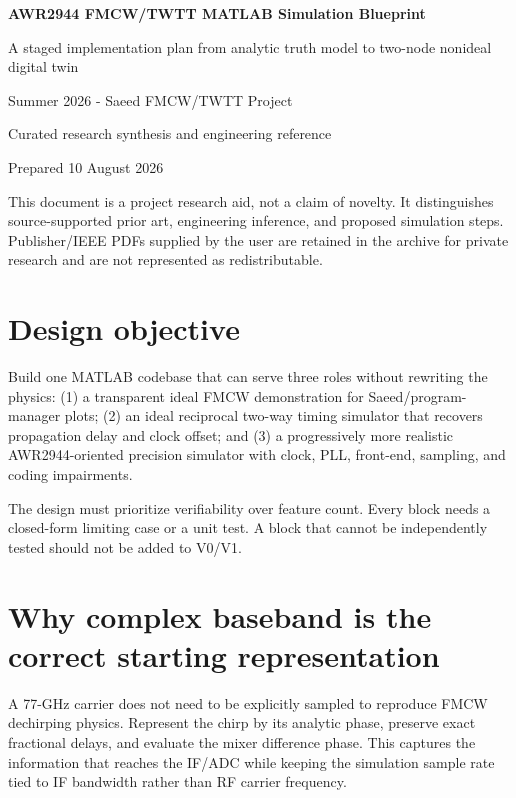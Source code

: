 \documentclass[11pt]{article}
\begin{document}
\begin{titlepage}
\centering
\vspace*{1.2in}
{\Huge\bfseries\color{navy} AWR2944 FMCW/TWTT MATLAB Simulation Blueprint\par}
\vspace{0.3in}
{\Large A staged implementation plan from analytic truth model to two-node nonideal digital twin\par}
\vspace{0.6in}
{\large Summer 2026 - Saeed FMCW/TWTT Project\par}
\vfill
{\large Curated research synthesis and engineering reference\par}
{\large Prepared 10 August 2026\par}
\vspace{0.4in}
\begin{minipage}{0.82\textwidth}
\small
This document is a project research aid, not a claim of novelty. It distinguishes source-supported prior art, engineering inference, and proposed simulation steps. Publisher/IEEE PDFs supplied by the user are retained in the archive for private research and are not represented as redistributable.
\end{minipage}
\end{titlepage}
\tableofcontents
\clearpage

\section{Design objective}
Build one MATLAB codebase that can serve three roles without rewriting the physics: (1) a transparent ideal FMCW demonstration for Saeed/program-manager plots; (2) an ideal reciprocal two-way timing simulator that recovers propagation delay and clock offset; and (3) a progressively more realistic AWR2944-oriented precision simulator with clock, PLL, front-end, sampling, and coding impairments.

The design must prioritize verifiability over feature count. Every block needs a closed-form limiting case or a unit test. A block that cannot be independently tested should not be added to V0/V1.

\section{Why complex baseband is the correct starting representation}
A 77-GHz carrier does not need to be explicitly sampled to reproduce FMCW dechirping physics. Represent the chirp by its analytic phase, preserve exact fractional delays, and evaluate the mixer difference phase. This captures the information that reaches the IF/ADC while keeping the simulation sample rate tied to IF bandwidth rather than RF carrier frequency.
\end{document}
